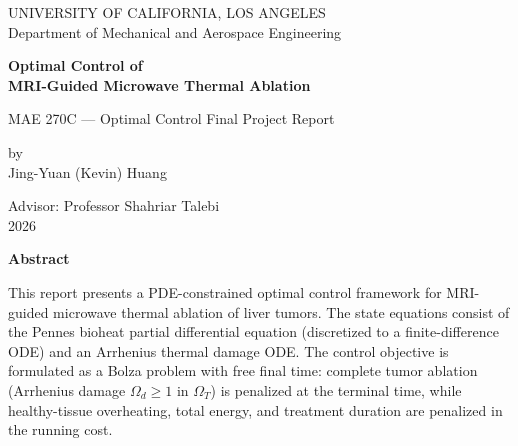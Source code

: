\pagestyle{empty}

\begin{titlepage}
    \begin{center}
    \normalsize
    \MakeUppercase{University of California, Los Angeles} \\
    Department of Mechanical and Aerospace Engineering \\

    \vspace{3.0cm}

    \Large
    {\bf Optimal Control of \\ MRI-Guided Microwave Thermal Ablation} \\

    \vspace{4.0cm}

    \normalsize
    MAE 270C — Optimal Control Final Project Report \\

    \vspace{2.5cm}

    by \\
    \vspace{1.0cm}
    Jing-Yuan (Kevin) Huang

    \vspace{2.0cm}

    Advisor: Professor Shahriar Talebi \\
    \vspace{0.5cm}
    2026
    \end{center}
\end{titlepage}

\pagestyle{plain}
\setcounter{page}{2}

\cleardoublepage
{}

\begin{center}\textbf{Abstract}\end{center}

\noindent
This report presents a PDE-constrained optimal control framework for
MRI-guided microwave thermal ablation of liver tumors.
The state equations consist of the Pennes bioheat partial differential equation
(discretized to a finite-difference ODE) and an Arrhenius thermal damage ODE.
The control objective is formulated as a Bolza problem with free final time:
complete tumor ablation (Arrhenius damage $\Omega_d \geq 1$ in $\Omega_T$)
is penalized at the terminal time, while healthy-tissue overheating,
total energy, and treatment duration are penalized in the running cost.

